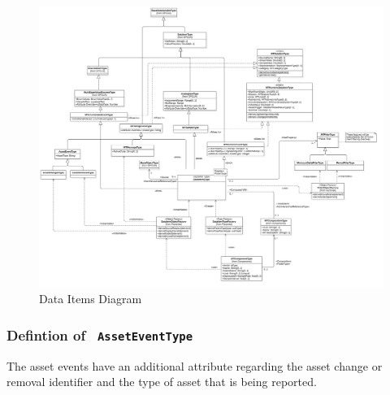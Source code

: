 \begin{figure}[ht]
  \centering
    \includegraphics[width=1.0\textwidth]{./diagrams/DataItems.png}
  \caption{Data Items Diagram}
  \label{fig:DataItems}
\end{figure}

\FloatBarrier

\subsubsection{Defintion of \texttt{ AssetEventType}} \label{type:AssetEventType}

\FloatBarrier

The asset events have an additional attribute regarding the asset change or removal identifier
and the type of asset that is being reported.


